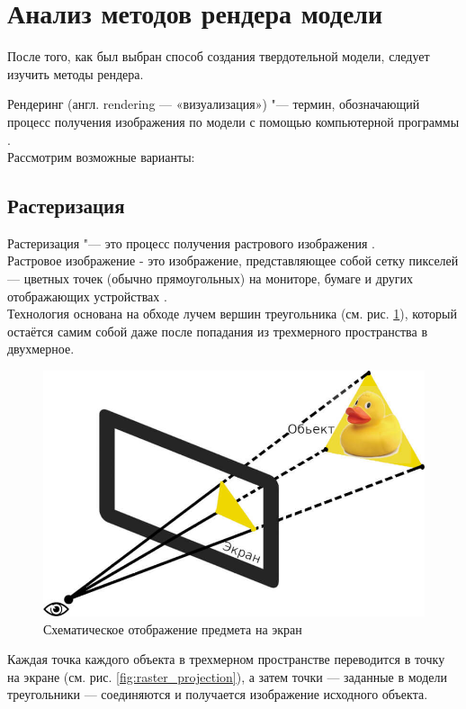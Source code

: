 \clearpage


\section{Анализ методов рендера модели}
После того, как был выбран способ создания твердотельной модели, следует изучить методы рендера.  

Рендеринг (англ. rendering — «визуализация») "--- термин, обозначающий процесс получения изображения по модели с помощью компьютерной программы \cite{article:rendering}.\\
Рассмотрим возможные варианты:

\subsection{Растеризация}
Растеризация "--- это процесс получения растрового изображения \cite{article:rasterization}.\\
Растровое изображение - это изображение, представляющее собой сетку пикселей — цветных точек (обычно прямоугольных) на мониторе, 
бумаге и других отображающих устройствах \cite{article:rastr_image}.\\  
Технология основана на обходе лучем вершин треугольника (см. рис. \ref{fig:raster_scene}), 
который остаётся самим собой даже после попадания из трехмерного пространства в двухмерное.\\
\begin{figure}
  \centering
  \includegraphics[scale=0.4]{inc/img/raster_scene}
  \caption{Схематическое отображение предмета на экран}
  \label{fig:raster_scene}
\end{figure}

\clearpage
Каждая точка каждого объекта в трехмерном пространстве переводится в точку на экране (см. рис. \ref{fig:raster_projection}),
а затем точки — заданные в модели треугольники — соединяются и получается изображение исходного объекта.\\

